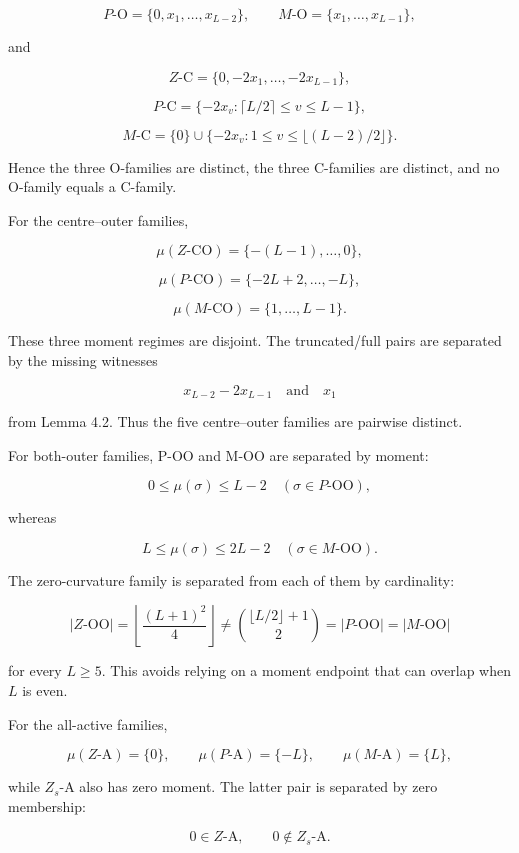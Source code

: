 \documentclass[
  british,
  a4paper,
  11pt]{article}
\begin{document}
\[
P\text{-O}=\{0,x_1,\ldots,x_{L-2}\},
\qquad
M\text{-O}=\{x_1,\ldots,x_{L-1}\},
\tag{5.4}
\]

and

\[
Z\text{-C}=\{0,-2x_1,\ldots,-2x_{L-1}\},
\]

\[
P\text{-C}
=
\{-2x_v:\lceil L/2\rceil\le v\le L-1\},
\]

\[
M\text{-C}
=
\{0\}\cup
\{-2x_v:1\le v\le\lfloor(L-2)/2\rfloor\}.
\tag{5.5}
\]

Hence the three O-families are distinct, the three C-families are
distinct, and no O-family equals a C-family.

For the centre--outer families,

\[
\mu(Z\text{-CO})=\{-(L-1),\ldots,0\},
\tag{5.6}
\]

\[
\mu(P\text{-CO})=\{-2L+2,\ldots,-L\},
\tag{5.7}
\]

\[
\mu(M\text{-CO})=\{1,\ldots,L-1\}.
\tag{5.8}
\]

These three moment regimes are disjoint. The truncated/full pairs are
separated by the missing witnesses

\[
x_{L-2}-2x_{L-1}
\quad\text{and}\quad
x_1
\tag{5.9}
\]

from Lemma 4.2. Thus the five centre--outer families are pairwise
distinct.

For both-outer families, P-OO and M-OO are separated by moment:

\[
0\le \mu(\sigma)\le L-2
\quad(\sigma\in P\text{-OO}),
\]

whereas

\[
L\le \mu(\sigma)\le2L-2
\quad(\sigma\in M\text{-OO}).
\tag{5.10}
\]

The zero-curvature family is separated from each of them by cardinality:

\[
|Z\text{-OO}|
=
\left\lfloor\frac{(L+1)^2}{4}\right\rfloor
\ne
\binom{\lfloor L/2\rfloor+1}{2}
=
|P\text{-OO}|=|M\text{-OO}|
\tag{5.11}
\]

for every \(L\ge5\). This avoids relying on a moment endpoint that can
overlap when \(L\) is even.

For the all-active families,

\[
\mu(Z\text{-A})=\{0\},
\qquad
\mu(P\text{-A})=\{-L\},
\qquad
\mu(M\text{-A})=\{L\},
\tag{5.12}
\]

while \(Z_s\)-A also has zero moment. The latter pair is separated by
zero membership:

\[
0\in Z\text{-A},
\qquad
0\notin Z_s\text{-A}.
\tag{5.13}
\]
\end{document}

